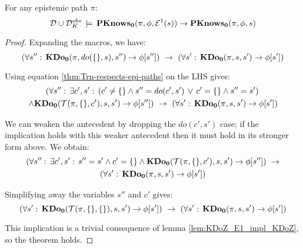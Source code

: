 \begin{thmext}
[\ref{thm:En_impl_En-1}] For any epistemic path $\pi$: \[
\mathcal{D}\cup\mathcal{D}_{K}^{obs}\,\models\,\mathbf{PKnows_{0}}(\pi,\phi,\mathcal{E}^{1}(s))\rightarrow\mathbf{PKnows_{0}}(\pi,\phi,s)\]

\end{thmext}
\begin{proof}
Expanding the macros, we have:\[
\left(\forall s'':\,\mathbf{KDo_{0}}(\pi,do(\{\},s),s'')\rightarrow\phi[s'']\right)\,\,\rightarrow\,\,\left(\forall s':\,\mathbf{KDo_{0}}(\pi,s,s')\rightarrow\phi[s']\right)\]


Using equation \ref{thm:Trn-respects-epi-paths} on the LHS gives:\begin{multline*}
\left(\forall s'':\,\exists c',s':\,\left(c'\neq\{\}\wedge s''=do(c',s')\,\vee\, c'=\{\}\wedge s''=s'\right)\right.\\
\left.\wedge\mathbf{KDo_{0}}(\mathcal{T}(\pi,\{\},c'),s,s')\rightarrow\phi[s'']\right)\,\,\rightarrow\,\,\left(\forall s':\,\mathbf{KDo_{0}}(\pi,s,s')\rightarrow\phi[s']\right)\end{multline*}


We can weaken the antecedent by dropping the $do(c',s')$ case;
if the implication holds with this weaker antecedent then it must
hold in its stronger form above. We obtain:\begin{multline*}
\left(\forall s'':\,\exists c',s':\, s''=s'\wedge c'=\{\}\wedge\mathbf{KDo_{0}}(\mathcal{T}(\pi,\{\},c'),s,s')\rightarrow\phi[s'']\right)\,\,\rightarrow\\
\left(\forall s':\,\mathbf{KDo_{0}}(\pi,s,s')\rightarrow\phi[s']\right)\end{multline*}


Simplifying away the variables $s''$ and $c'$ gives:\[
\left(\forall s':\,\mathbf{KDo_{0}}(\mathcal{T}(\pi,\{\},\{\}),s,s')\rightarrow\phi[s']\right)\,\,\rightarrow\,\,\left(\forall s':\,\mathbf{KDo_{0}}(\pi,s,s')\rightarrow\phi[s']\right)\]


This implication is a trivial consequence of lemma \ref{lem:KDoZ_E1_impl_KDoZ},
so the theorem holds. 
\end{proof}
\bigskip{}


